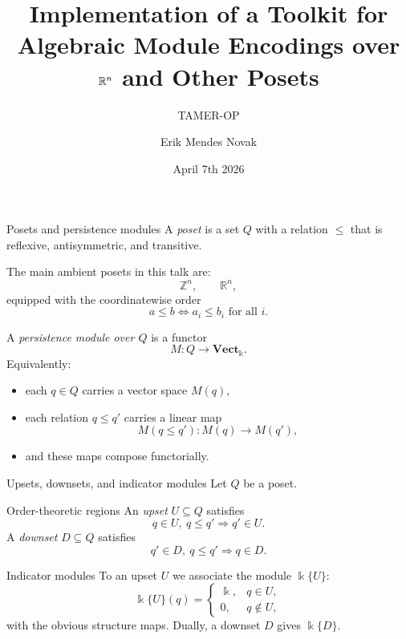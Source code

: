 \documentclass[aspectratio=169,11pt]{beamer}
\title{Implementation of a Toolkit for Algebraic Module Encodings over $\mathbb{R}^n$ and Other Posets}
\subtitle{TAMER-OP}
\author{Erik Mendes Novak}
\date{April 7th 2026}
\newcommand{\kk}{\Bbbk}
\begin{document}
\begin{frame}
  \titlepage
\end{frame}


\begin{frame}{Posets and persistence modules}
	\small
	A \emph{poset} is a set $Q$ with a relation $\leq$ that is reflexive,
	antisymmetric, and transitive.
	
	\vspace{0.5em}
	The main ambient posets in this talk are:
	\[
	\mathbb{Z}^n,\qquad \mathbb{R}^n,
	\]
	equipped with the coordinatewise order
	\[
	a \leq b \iff a_i \leq b_i \text{ for all } i.
	\]
	
	\vspace{0.5em}
	A \emph{persistence module over $Q$} is a functor
	\[
	M : Q \to \mathbf{Vect}_{\kk}.
	\]
	Equivalently:
	\begin{itemize}
		\item each $q \in Q$ carries a vector space $M(q)$,
		\item each relation $q \leq q'$ carries a linear map
		\[
		M(q \leq q') : M(q) \to M(q'),
		\]
		\item and these maps compose functorially.
	\end{itemize}
	
\end{frame}

\begin{frame}{Upsets, downsets, and indicator modules}
	\small
	Let $Q$ be a poset.
	
	\begin{block}{Order-theoretic regions}
		An \emph{upset} $U \subseteq Q$ satisfies
		\[
		q \in U,\ q \leq q' \Longrightarrow q' \in U.
		\]
		A \emph{downset} $D \subseteq Q$ satisfies
		\[
		q' \in D,\ q \leq q' \Longrightarrow q \in D.
		\]
	\end{block}
	
	\begin{block}{Indicator modules}
		To an upset $U$ we associate the module $\kk\{U\}$:
		\[
		\kk\{U\}(q)=
		\begin{cases}
			\kk, & q \in U,\\
			0, & q \notin U,
		\end{cases}
		\]
		with the obvious structure maps. Dually, a downset $D$ gives $\kk\{D\}$.
	\end{block}
\end{frame}
	
\end{document}
